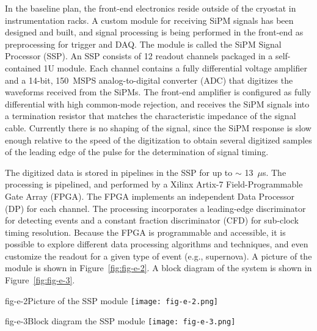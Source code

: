 In the baseline\fixme{}  plan, the front-end electronics reside outside of the
cryostat in instrumentation racks.   A
custom module for receiving SiPM signals has been designed and built, and signal
processing is being performed in the front-end as preprocessing for trigger and DAQ.  The
module is called the SiPM Signal Processor (SSP).  An SSP consists of
12 readout channels packaged in a self-contained 1U module.  Each
channel contains a fully differential voltage amplifier and a 14-bit,
150~MSPS analog-to-digital converter (ADC) that digitizes the
waveforms received from the SiPMs.  The front-end amplifier is
configured as fully differential with high common-mode rejection, and
receives the SiPM signals into a termination resistor that matches the
characteristic impedance of the signal cable.  Currently there is no
shaping of the signal, since the SiPM response is slow enough relative
to the speed of the digitization to obtain several digitized samples
of the leading edge of the pulse for the determination of signal
timing.

The digitized data is stored in pipelines in the SSP for up to $\sim$
13~$\mu$s.  The processing is pipelined, and performed by a Xilinx
Artix-7 Field-Programmable Gate Array (FPGA).  The FPGA implements an
independent Data Processor (DP) for each channel.  The processing
incorporates a leading-edge discriminator for detecting events and a
constant fraction discriminator (CFD) for sub-clock timing resolution.
Because the FPGA is programmable and accessible, it is possible to
explore different data processing algorithms and techniques, and even
customize the readout for a given type of event (e.g., supernova).  A picture of the module is shown in Figure~\ref{fig:fig-e-2}.
A block diagram of the system is shown in Figure~\ref{fig:fig-e-3}.

\begin{cdrfigure}{fig-e-2}{Picture of the SSP module}
\texttt{[image: fig-e-2.png]}
\end{cdrfigure}

\begin{cdrfigure}{fig-e-3}{Block diagram the SSP module}
\texttt{[image: fig-e-3.png]}
\end{cdrfigure}

